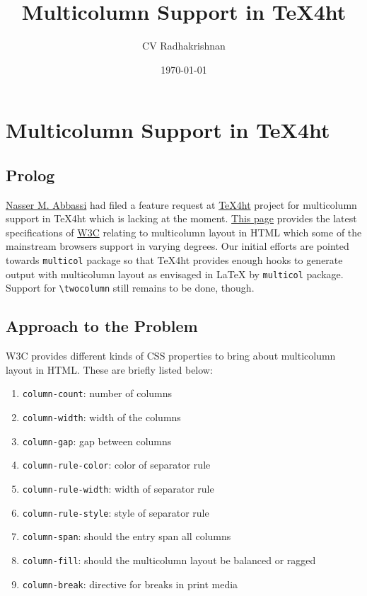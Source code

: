 \documentclass{article}
\author{CV Radhakrishnan}
\date{\today}
\title{Multicolumn Support in TeX4ht}
\begin{document}
\maketitle
\tableofcontents
\else
\chapter{Multicolumn Support in \TeX4ht}
\fi

\section*{Prolog}
\label{sec-1}

\href{http://www.12000.org/}{Nasser M. Abbassi} had filed a feature
request at \href{http://puszcza.gnu.org.ua/bugs/?188}{TeX4ht} project
for multicolumn support in TeX4ht which is lacking at the
moment. \href{http://www.w3.org/TR/css3-multicol/}{This page} provides
the latest specifications of \href{http://www.w3.org}{W3C} relating to
multicolumn layout in HTML which some of the mainstream browsers support
in varying degrees.  Our initial efforts are pointed towards
\texttt{multicol} package so that TeX4ht provides enough hooks to
generate output with multicolumn layout as envisaged in \LaTeX{} by
\texttt{multicol} package.  Support for
\texttt{\textbackslash{}twocolumn} still remains to be done, though.

\section*{Approach to the Problem}
\label{sec-2}

W3C provides different kinds of CSS properties to bring about
multicolumn layout in HTML. These are briefly listed below:

\begin{enumerate}
\item \texttt{column-count}: number of columns
\item \texttt{column-width}: width of the columns
\item \texttt{column-gap}: gap between columns
\item \texttt{column-rule-color}: color of separator rule
\item \texttt{column-rule-width}: width of separator rule
\item \texttt{column-rule-style}: style of separator rule
\item \texttt{column-span}: should the entry span all columns
\item \texttt{column-fill}: should the multicolumn layout be balanced or ragged
\item \texttt{column-break}: directive for breaks in print media
\end{enumerate}
\end{document}
